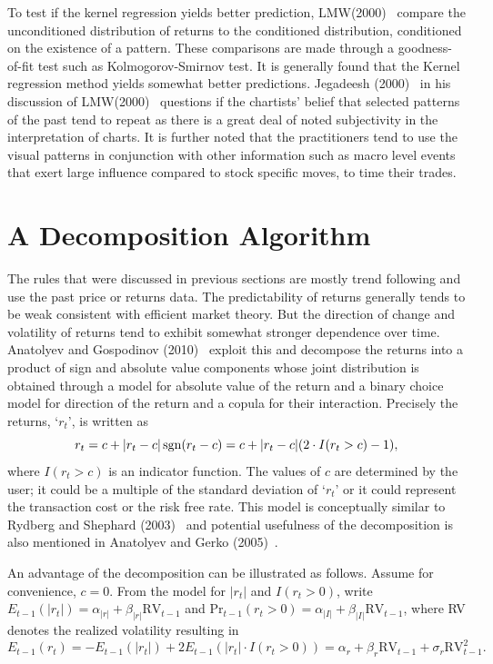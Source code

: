 To test if the kernel regression yields better prediction, LMW(2000)~\cite{LoMWang} compare the unconditioned distribution of returns to the conditioned distribution, conditioned on the existence of a pattern. These comparisons are made through a goodness-of-fit test such as Kolmogorov-Smirnov test. It  is generally found that the Kernel regression method yields somewhat better predictions. Jegadeesh (2000)~\cite{Jeqa} in his discussion of LMW(2000)~\cite{LoMWang} questions if the chartists' belief that selected patterns of the past tend to repeat as there is a great deal of noted subjectivity in the interpretation of charts. It is further noted that the practitioners tend to use the visual patterns in conjunction with other information such as macro level events that exert large influence compared to stock specific moves, to time their trades.



\section{A Decomposition Algorithm \label{s:decomp_alg}}


The rules that were discussed in previous sections are mostly trend following and use the past price or returns data. The predictability of returns generally tends to be weak consistent with efficient market theory. But the direction of change and volatility of returns tend to exhibit somewhat stronger dependence over time. Anatolyev and Gospodinov (2010)~\cite{Ananto2} exploit this and decompose the returns into a product of sign and absolute value components whose joint distribution is obtained through a model for absolute value of the return and a binary choice model for direction of the return and a copula for their interaction. Precisely the returns, `$r_{t}$', is written as
	\begin{equation} \label{eqn:3sgn}
	r_t = c + \lvert r_t - c\rvert \sgn (r_t - c)= c + \lvert r_t - c \rvert (2\cdot I(r_t  > c) - 1),
	\end{equation}
where $I(r_t > c)$ is an indicator function. The values of $c$ are determined by the user; it could be a multiple of the standard deviation of `$r_{t}$' or it could represent the transaction cost or the risk free rate. This model is conceptually similar to Rydberg and Shephard (2003)~\cite{Ryd} and potential usefulness of the decomposition is also mentioned in Anatolyev and Gerko (2005)~\cite{Ananto1}.


An advantage of the decomposition can be illustrated as follows. Assume for convenience, $c = 0$. From the model for $|r_t|$ and $I(r_t > 0)$, write $E_{t-1}(\left|r_{t}\right|) = \alpha_{\left|r\right|} + \beta_{\left| r \right|}\text{RV}_{t-1}$ and $\text{Pr}_{t-1}(r_t >0) = \alpha_{\left| I \right|} + \beta_{\left| I \right|}\text{RV}_{t-1}$, where RV denotes the realized volatility resulting in 
	\[
	E_{t-1}(r_t)= -E_{t-1}(\left| r_t \right|) + 2E_{t-1}(\left| r_{t} \right| \cdot I(r_{t} > 0))= \alpha_{r} + \beta_{r} \text{RV}_{t-1} + \sigma_{r} \text{RV}_{t-1}^2.
	\]


